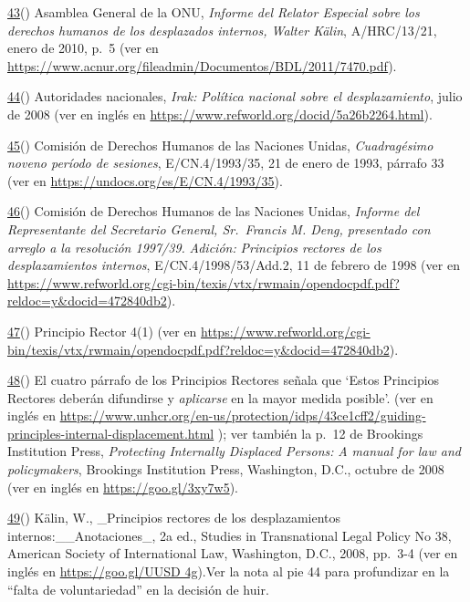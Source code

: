 \documentclass[
]{book}
\begin{document}
\protect\hyperlink{sdfootnote43anc}{43}() Asamblea General de la ONU, \emph{Informe del Relator Especial sobre los derechos humanos de los desplazados internos, Walter Kälin}, A/HRC/13/21, enero de 2010, p.~5 (ver en \url{https://www.acnur.org/fileadmin/Documentos/BDL/2011/7470.pdf}).

\protect\hyperlink{sdfootnote44anc}{44}() Autoridades nacionales, \emph{Irak:} \emph{Política nacional sobre el desplazamiento}, julio de 2008 (ver en inglés en \url{https://www.refworld.org/docid/5a26b2264.html}).

\protect\hyperlink{sdfootnote45anc}{45}() Comisión de Derechos Humanos de las Naciones Unidas, \emph{Cuadragésimo noveno período de sesiones}, E/CN.4/1993/35, 21 de enero de 1993, párrafo 33 (ver en \href{https://goo.gl/uBDWXL}{https://undocs.org/es/E/CN.4/1993/35}).

\protect\hyperlink{sdfootnote46anc}{46}() Comisión de Derechos Humanos de las Naciones Unidas, \emph{Informe del Representante del Secretario General, Sr.~Francis M. Deng, presentado con arreglo a la resolución 1997/39.} \emph{Adición:} \emph{Principios rectores de los desplazamientos internos}, E/CN.4/1998/53/Add.2, 11 de febrero de 1998 (ver en \url{https://www.refworld.org/cgi-bin/texis/vtx/rwmain/opendocpdf.pdf?reldoc=y\&docid=472840db2}).

\protect\hyperlink{sdfootnote47anc}{47}() Principio Rector 4(1) (ver en \url{https://www.refworld.org/cgi-bin/texis/vtx/rwmain/opendocpdf.pdf?reldoc=y\&docid=472840db2}).

\protect\hyperlink{sdfootnote48anc}{48}() El cuatro párrafo de los Principios Rectores señala que `Estos Principios Rectores deberán difundirse y \emph{aplicarse} en la mayor medida posible'. (ver en inglés en \url{https://www.unhcr.org/en-us/protection/idps/43ce1cff2/guiding-principles-internal-displacement.html} ); ver también la p.~12 de Brookings Institution Press, \emph{Protecting Internally Displaced Persons:} \emph{A manual for law and policymakers}, Brookings Institution Press, Washington, D.C., octubre de 2008 (ver en inglés en \url{https://goo.gl/3xy7w5}).

\protect\hyperlink{sdfootnote49anc}{49}() Kälin, W., \_Principios rectores de los desplazamientos internos:\_\_Anotaciones\_, 2a ed., Studies in Transnational Legal Policy No 38, American Society of International Law, Washington, D.C., 2008, pp.~3-4 (ver en inglés en \href{https://goo.gl/UUSD4g}{https://goo.gl/UUSD 4g}).Ver la nota al pie 44 para profundizar en la ``falta de voluntariedad'' en la decisión de huir.
\end{document}
